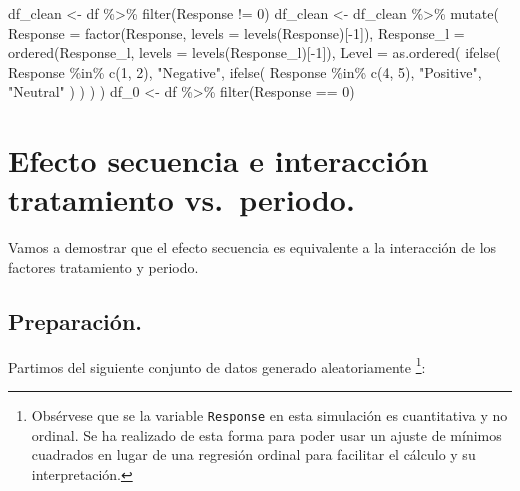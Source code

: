 \documentclass[
  12pt,
  a4paper,
  extrafontsizes,
  onecolumn,
  openright]{memoir}
\newenvironment{Shaded}{\begin{snugshade}}{\end{snugshade}}
\newcommand{\AttributeTok}[1]{\textcolor[rgb]{0.40,0.45,0.13}{#1}}
\newcommand{\DecValTok}[1]{\textcolor[rgb]{0.68,0.00,0.00}{#1}}
\newcommand{\FunctionTok}[1]{\textcolor[rgb]{0.28,0.35,0.67}{#1}}
\newcommand{\NormalTok}[1]{\textcolor[rgb]{0.00,0.23,0.31}{#1}}
\newcommand{\OtherTok}[1]{\textcolor[rgb]{0.00,0.23,0.31}{#1}}
\newcommand{\SpecialCharTok}[1]{\textcolor[rgb]{0.37,0.37,0.37}{#1}}
\newcommand{\StringTok}[1]{\textcolor[rgb]{0.13,0.47,0.30}{#1}}
\begin{document}
\begin{Shaded}
\begin{Highlighting}[]
\NormalTok{df\_clean }\OtherTok{\textless{}{-}}\NormalTok{ df }\SpecialCharTok{\%\textgreater{}\%} \FunctionTok{filter}\NormalTok{(Response }\SpecialCharTok{!=} \DecValTok{0}\NormalTok{)}
\NormalTok{df\_clean }\OtherTok{\textless{}{-}}\NormalTok{ df\_clean }\SpecialCharTok{\%\textgreater{}\%} \FunctionTok{mutate}\NormalTok{(}
    \AttributeTok{Response =} \FunctionTok{factor}\NormalTok{(Response, }\AttributeTok{levels =} \FunctionTok{levels}\NormalTok{(Response)[}\SpecialCharTok{{-}}\DecValTok{1}\NormalTok{]),}
    \AttributeTok{Response\_l =} \FunctionTok{ordered}\NormalTok{(Response\_l, }\AttributeTok{levels =} \FunctionTok{levels}\NormalTok{(Response\_l)[}\SpecialCharTok{{-}}\DecValTok{1}\NormalTok{]),}
    \AttributeTok{Level =} \FunctionTok{as.ordered}\NormalTok{(}
        \FunctionTok{ifelse}\NormalTok{(}
\NormalTok{            Response }\SpecialCharTok{\%in\%} \FunctionTok{c}\NormalTok{(}\DecValTok{1}\NormalTok{, }\DecValTok{2}\NormalTok{),}
            \StringTok{"Negative"}\NormalTok{,}
            \FunctionTok{ifelse}\NormalTok{(}
\NormalTok{                Response }\SpecialCharTok{\%in\%} \FunctionTok{c}\NormalTok{(}\DecValTok{4}\NormalTok{, }\DecValTok{5}\NormalTok{),}
                \StringTok{"Positive"}\NormalTok{,}
                \StringTok{"Neutral"}
\NormalTok{            )}
\NormalTok{        )}
\NormalTok{    )}
\NormalTok{)}
\NormalTok{df\_0 }\OtherTok{\textless{}{-}}\NormalTok{ df }\SpecialCharTok{\%\textgreater{}\%} \FunctionTok{filter}\NormalTok{(Response }\SpecialCharTok{==} \DecValTok{0}\NormalTok{)}
\end{Highlighting}
\end{Shaded}

\normalsize

\hypertarget{sec-contrasts}{%
\chapter{Efecto secuencia e interacción tratamiento
vs.~periodo.}\label{sec-contrasts}}

Vamos a demostrar que el efecto secuencia es equivalente a la
interacción de los factores tratamiento y periodo.

\hypertarget{preparaciuxf3n.}{%
\section{Preparación.}\label{preparaciuxf3n.}}

Partimos del siguiente conjunto de datos generado aleatoriamente
\footnote{Obsérvese que se la variable \texttt{Response} en esta
  simulación es cuantitativa y no ordinal. Se ha realizado de esta forma
  para poder usar un ajuste de mínimos cuadrados en lugar de una
  regresión ordinal para facilitar el cálculo y su interpretación.}:
\scriptsize
\end{document}
